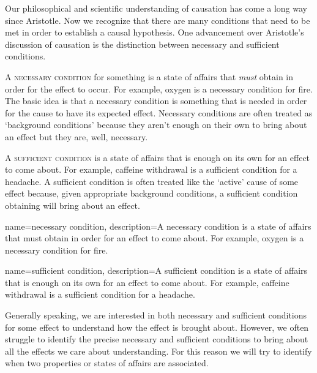 Our philosophical and scientific understanding of causation has come a long way since Aristotle. Now we recognize that there are many conditions that need to be met in order to establish a causal hypothesis. One advancement over Aristotle's discussion of causation is the distinction between necessary and sufficient conditions.

A \textsc{\gls{necessary condition}} for something is a state of affairs that \emph{must} obtain in order for the effect to occur. For example, oxygen is a necessary condition for fire. The basic idea is that a necessary condition is something that is needed in order for the cause to have its expected effect. Necessary conditions are often treated as `background conditions' because they aren't enough on their own to bring about an effect but they are, well, necessary.

A \textsc{\gls{sufficient condition}} is a state of affairs that is enough on its own for an effect to come about. For example, caffeine withdrawal is a sufficient condition for a headache. A sufficient condition is often treated like the `active' cause of some effect because, given appropriate background conditions, a sufficient condition obtaining will bring about an effect.

{
name=necessary condition,
description={A necessary condition is a state of affairs that must obtain in order for an effect to come about. For example, oxygen is a necessary condition for fire.}
}

{
name=sufficient condition,
description={A sufficient condition is a state of affairs that is enough on its own for an effect to come about. For example, caffeine withdrawal is a sufficient condition for a headache.}
}

Generally speaking, we are interested in both necessary and sufficient conditions for some effect to understand how the effect is brought about. However, we often struggle to identify the precise necessary and sufficient conditions to bring about all the effects we care about understanding. For this reason we will try to identify when two properties or states of affairs are associated.

